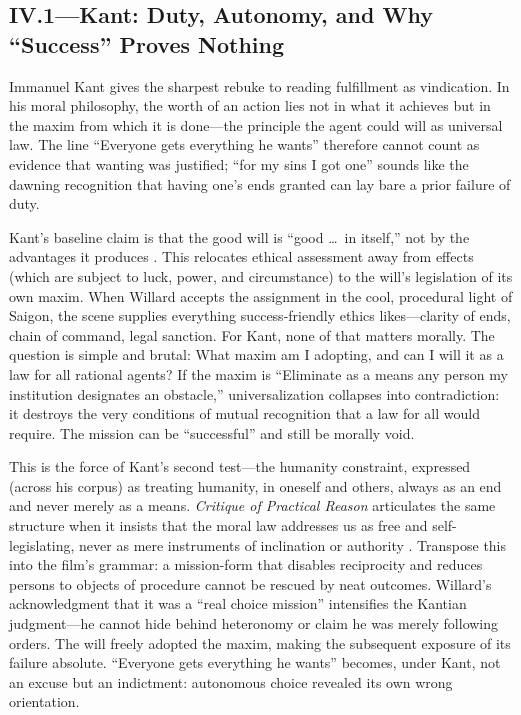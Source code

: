 \subsection*{IV.1—Kant: Duty, Autonomy, and Why ``Success'' Proves Nothing}
\label{ssec:iii-kant}
Immanuel Kant gives the sharpest rebuke to reading fulfillment as vindication. In his moral
philosophy, the worth of an action lies not in what it achieves but in the maxim from which
it is done—the
principle the agent could will as universal law. The line ``Everyone gets everything he wants''
therefore cannot count as evidence that wanting was justified; ``for my sins I got one'' sounds
like the dawning recognition that having one's ends granted can lay bare a prior failure of
duty.

Kant's baseline claim is that the good will is ``good \ldots\ in itself,'' not by the
advantages it produces \parencite[p.~27]{KantCPrR1996}. This relocates ethical assessment away
from effects (which are subject to luck, power, and circumstance) to the will's legislation of
its own maxim. When Willard accepts the assignment in the cool, procedural light of Saigon,
the scene supplies everything success-friendly ethics likes—clarity of ends, chain of command,
legal sanction. For Kant, none of that matters morally. The question is simple and brutal:
What maxim am I adopting, and can I will it as a law for all rational agents? If the maxim is
``Eliminate as a means any person my institution designates an obstacle,'' universalization
collapses into contradiction: it destroys the very conditions of mutual recognition that a law
for all would require. The mission can be ``successful'' and still be morally void.

This is the force of Kant's second test—the humanity constraint, expressed (across his corpus)
as treating humanity, in oneself and others, always as an end and never merely as a means.
\emph{Critique of Practical Reason} articulates the same structure when it insists that the
moral law addresses us as free and self-legislating, never as mere instruments of inclination
or authority \parencite[pp.~30--33]{KantCPrR1996}. Transpose this into the film's grammar:
a mission-form that disables reciprocity and reduces persons to objects of procedure cannot be
rescued by neat outcomes. Willard's acknowledgment that it was a ``real choice mission''
intensifies the Kantian judgment---he cannot hide behind heteronomy or claim he was merely
following orders. The will freely adopted the maxim, making the subsequent exposure of its
failure absolute. ``Everyone gets everything he wants'' becomes, under Kant, not an excuse but
an indictment: autonomous choice revealed its own wrong orientation.

